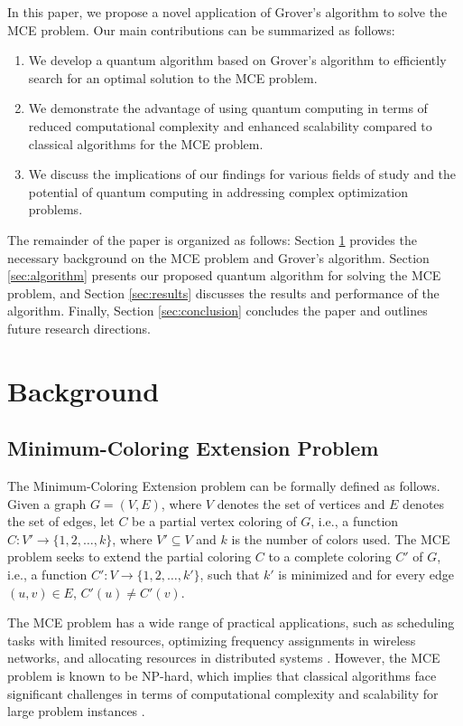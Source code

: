 In this paper, we propose a novel application of Grover's algorithm to solve the MCE problem. Our main contributions can be summarized as follows:

\begin{enumerate}
    \item We develop a quantum algorithm based on Grover's algorithm to efficiently search for an optimal solution to the MCE problem.
    \item We demonstrate the advantage of using quantum computing in terms of reduced computational complexity and enhanced scalability compared to classical algorithms for the MCE problem.
    \item We discuss the implications of our findings for various fields of study and the potential of quantum computing in addressing complex optimization problems.
\end{enumerate}

The remainder of the paper is organized as follows: Section \ref{sec:background} provides the necessary background on the MCE problem and Grover's algorithm. Section \ref{sec:algorithm} presents our proposed quantum algorithm for solving the MCE problem, and Section \ref{sec:results} discusses the results and performance of the algorithm. Finally, Section \ref{sec:conclusion} concludes the paper and outlines future research directions.

\section{Background}
\label{sec:background}

\subsection{Minimum-Coloring Extension Problem}

The Minimum-Coloring Extension problem can be formally defined as follows. Given a graph $G = (V, E)$, where $V$ denotes the set of vertices and $E$ denotes the set of edges, let $C$ be a partial vertex coloring of $G$, i.e., a function $C: V' \rightarrow \{1, 2, \dots, k\}$, where $V' \subseteq V$ and $k$ is the number of colors used. The MCE problem seeks to extend the partial coloring $C$ to a complete coloring $C'$ of $G$, i.e., a function $C': V \rightarrow \{1, 2, \dots, k'\}$, such that $k'$ is minimized and for every edge $(u, v) \in E$, $C'(u) \neq C'(v)$.

The MCE problem has a wide range of practical applications, such as scheduling tasks with limited resources, optimizing frequency assignments in wireless networks, and allocating resources in distributed systems \cite{application1, application2}. However, the MCE problem is known to be NP-hard, which implies that classical algorithms face significant challenges in terms of computational complexity and scalability for large problem instances \cite{nphard}.


